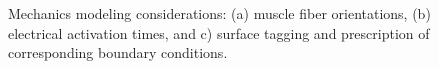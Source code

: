 \begin{figure}[ht]
{\label{fig:supp3}}
%
\caption{Mechanics modeling considerations: (a) muscle fiber orientations, (b) electrical activation times, and c) surface tagging and prescription of corresponding boundary conditions.}
\label{fig:supp}
\end{figure}

\begin{figure}[ht]
\centering
{}		
\subfigure[]{%
}
\end{figure}
